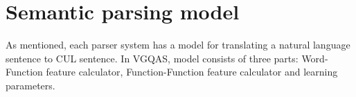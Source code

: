 \section{Semantic parsing model}
\label{sec:model}
As mentioned, each parser system has a model for translating a natural language sentence to CUL sentence. In VGQAS, model consists of three parts: Word-Function feature calculator, Function-Function feature calculator and learning parameters.

